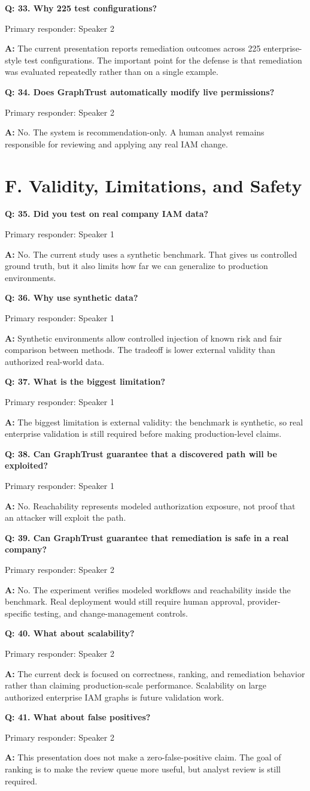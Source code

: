 \documentclass[11pt,a4paper]{article}
\newcommand{\q}[1]{\vspace{0.35em}\textbf{Q: #1}\par}
\newcommand{\a}[1]{\textbf{A:} #1\par}
\newcommand{\owner}[1]{\textcolor{Muted}{\small Primary responder: #1}\par}
\begin{document}
\q{33. Why 225 test configurations?}
\owner{Speaker 2}
\a{The current presentation reports remediation outcomes across 225 enterprise-style test configurations. The important point for the defense is that remediation was evaluated repeatedly rather than on a single example.}

\q{34. Does GraphTrust automatically modify live permissions?}
\owner{Speaker 2}
\a{No. The system is recommendation-only. A human analyst remains responsible for reviewing and applying any real IAM change.}

\section*{F. Validity, Limitations, and Safety}

\q{35. Did you test on real company IAM data?}
\owner{Speaker 1}
\a{No. The current study uses a synthetic benchmark. That gives us controlled ground truth, but it also limits how far we can generalize to production environments.}

\q{36. Why use synthetic data?}
\owner{Speaker 1}
\a{Synthetic environments allow controlled injection of known risk and fair comparison between methods. The tradeoff is lower external validity than authorized real-world data.}

\q{37. What is the biggest limitation?}
\owner{Speaker 1}
\a{The biggest limitation is external validity: the benchmark is synthetic, so real enterprise validation is still required before making production-level claims.}

\q{38. Can GraphTrust guarantee that a discovered path will be exploited?}
\owner{Speaker 1}
\a{No. Reachability represents modeled authorization exposure, not proof that an attacker will exploit the path.}

\q{39. Can GraphTrust guarantee that remediation is safe in a real company?}
\owner{Speaker 2}
\a{No. The experiment verifies modeled workflows and reachability inside the benchmark. Real deployment would still require human approval, provider-specific testing, and change-management controls.}

\q{40. What about scalability?}
\owner{Speaker 2}
\a{The current deck is focused on correctness, ranking, and remediation behavior rather than claiming production-scale performance. Scalability on large authorized enterprise IAM graphs is future validation work.}

\q{41. What about false positives?}
\owner{Speaker 2}
\a{This presentation does not make a zero-false-positive claim. The goal of ranking is to make the review queue more useful, but analyst review is still required.}
\end{document}
